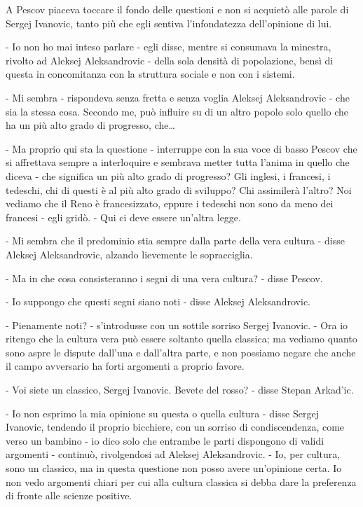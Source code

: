 \label{x-3} 

A Pescov piaceva toccare il fondo delle questioni e non si acquietò alle parole di Sergej Ivanovic, tanto più che egli sentiva l'infondatezza dell'opinione di lui. 

- Io non ho mai inteso parlare - egli disse, mentre si consumava la minestra, rivolto ad Aleksej Aleksandrovic - della sola densità di popolazione, bensì di questa in concomitanza con la struttura sociale e non con i sistemi. 

- Mi sembra - rispondeva senza fretta e senza voglia Aleksej Aleksandrovic - che sia la stessa cosa. Secondo me, può influire su di un altro popolo solo quello che ha un più alto grado di progresso, che\ldots{} 

- Ma proprio qui sta la questione - interruppe con la sua voce di basso Pescov che si affrettava sempre a interloquire e sembrava metter tutta l'anima in quello che diceva - che significa un più alto grado di progresso? Gli inglesi, i francesi, i tedeschi, chi di questi è al più alto grado di sviluppo? Chi assimilerà l'altro? Noi vediamo che il Reno è francesizzato, eppure i tedeschi non sono da meno dei francesi - egli gridò. - Qui ci deve essere un'altra legge. 

- Mi sembra che il predominio stia sempre dalla parte della vera cultura - disse Aleksej Aleksandrovic, alzando lievemente le sopracciglia. 

- Ma in che cosa consisteranno i segni di una vera cultura? - disse Pescov. 

- Io suppongo che questi segni siano noti - disse Aleksej Aleksandrovic. 

- Pienamente noti? - s'introdusse con un sottile sorriso Sergej Ivanovic. - Ora io ritengo che la cultura vera può essere soltanto quella classica; ma vediamo quanto sono aspre le dispute dall'una e dall'altra parte, e non possiamo negare che anche il campo avversario ha forti argomenti a proprio favore. 

- Voi siete un classico, Sergej Ivanovic. Bevete del rosso? - disse Stepan Arkad'ic. 

- Io non esprimo la mia opinione su questa o quella cultura - disse Sergej Ivanovic, tendendo il proprio bicchiere, con un sorriso di condiscendenza, come verso un bambino - io dico solo che entrambe le parti dispongono di validi argomenti - continuò, rivolgendosi ad Aleksej Aleksandrovic. - Io, per cultura, sono un classico, ma in questa questione non posso avere un'opinione certa. Io non vedo argomenti chiari per cui alla cultura classica si debba dare la preferenza di fronte alle scienze positive. 

